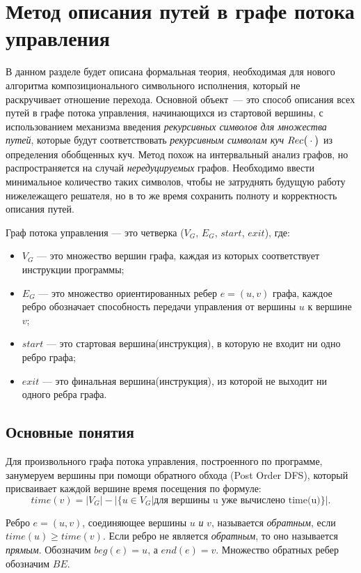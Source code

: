 \section{Метод описания путей в графе потока управления}
В данном разделе будет описана формальная теория, необходимая для нового алгоритма композиционального символьного исполнения, который не раскручивает отношение перехода. Основной объект~--- это способ описания всех путей в графе потока управления, начинающихся из стартовой вершины, с использованием механизма введения \emph{рекурсивных символов для множества путей}, которые будут соответствовать \emph{рекурсивным символам куч} $Rec\big(\cdot\big)$ из определения обобщенных куч. Метод похож на интервальный анализ графов, но распространяется на случай \emph{нередуцируемых} графов.
Необходимо ввести минимальное количество таких символов, чтобы не затруднять будущую работу нижележащего решателя, но в то же время сохранить полноту и корректность описания путей.

\begin{defn}
Граф потока управления --- это четверка ($V_G$, $E_G$, $start$, $exit$), где:
\begin{itemize}
    \item $V_G$ --- это множество вершин графа, каждая из которых соответствует инструкции программы;
    \item $E_G$ --- это множество ориентированных ребер $e = (u, v)$ графа, каждое ребро обозначает способность передачи управления от вершины $u$ к вершине $v$;
    \item $start$ --- это стартовая вершина(инструкция), в которую не входит ни одно ребро графа;
    \item $exit$ --- это финальная вершина(инструкция), из которой не выходит ни одного ребра графа.
\end{itemize}
\end{defn}

\subsection{Основные понятия}
Для произвольного графа потока управления, построенного по программе,
занумеруем вершины при помощи обратного обхода (Post Order DFS), который присваивает каждой вершине время посещения по формуле:
$$time(v) = |V_G| - |\{u \in V_G| \mbox{для вершины u уже вычислено time(u)}\}|.$$

\begin{defn}\label{backEdges}
Ребро $e = (u,v)$, соединяющее вершины $u$ \emph{и} $v$, называется \emph{обратным}, если $time(u) \geq time(v)$. 
Если ребро не является \emph{обратным}, то оно называется \emph{прямым}.
Обозначим $beg(e) = u$, а $end(e) = v$.
Множество обратных ребер обозначим $BE$.
\end{defn}

